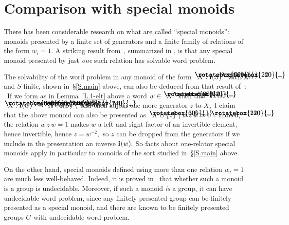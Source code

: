 \documentclass{amsart}
\numberwithin{equation}{section}
\newcommand{\I}{\mathbf{i}\hspace{.05em}}
\newcommand{\langl}{\begin{picture}(.51em,1em)
\put(.11em,.33em){\rotatebox{60}{\line(1,0){.55em}}}
\put(.11em,.33em){\rotatebox{300}{\line(1,0){.55em}}}
\end{picture}}
\newcommand{\rangl}{\begin{picture}(.5em,1em)
\put(.09em,.33em){\rotatebox{120}{\line(1,0){.55em}}}
\put(.09em,.33em){\rotatebox{240}{\line(1,0){.55em}}}
\end{picture}}
\begin{document}
\section{Comparison with special monoids}\label{S.special}

There has been considerable research on what are called
``special monoids'':~ monoids presented by a finite set of generators
and a finite family of relations of the form $w_i=1.$
A striking result from~\cite{Adjan}, summarized in
\cite[p.\,1876, statement~(A1), and
Theorem~1.1 and following paragraph]{RG+NR},
is that any special monoid presented by just {\em one} such
relation has solvable word problem.

The solvability of the word problem in any monoid
of the form $\langl X:\I(S)\rangl$ with $X$ and $S$ finite,
shown in~\S\ref{S.main} above, can
also be deduced from that result of~\cite{Adjan}: \ If we
form as in Lemma~\ref{L.1-elt} above a word $w\in\langl X\rangl$
such that $\langl X:\I(w)\rangl\cong\langl X:\I(S)\rangl,$
and then adjoin one more generator $z$ to $X,$ I claim
that the above monoid
can also be presented as $\langl X\cup\{z\}\ |\ w\,z\,w=1\rangl.$
Indeed, the relation $w\,z\,w=1$ makes $w$ a left
and right factor of an invertible element, hence invertible, hence
$z=w^{-2},$ so $z$ can be dropped from the
generators if we include in the presentation an inverse $\I(w).$
So facts about one-relator special monoids apply in particular
to monoids of the sort studied in~\S\ref{S.main} above.

On the other hand, special monoids defined using more than one
relation $w_i=1$ are much less well-behaved.
Indeed, it is proved in~\cite{PN+CO+FO} that whether such
a monoid is a group is undecidable.
Moreover, if such a monoid {\em is} a group, it can
have undecidable word problem, since
any finitely presented group can be finitely presented as a
special monoid, and there are known to be finitely presented
groups $G$ with undecidable word problem.
\end{document}
